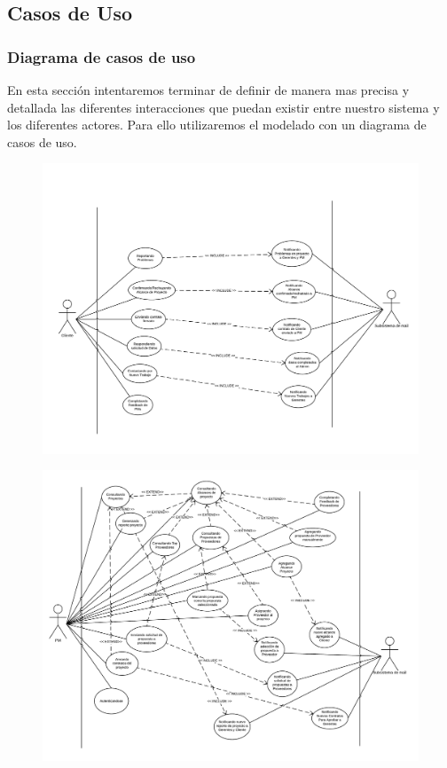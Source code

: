 \subsection{Casos de Uso}
	\subsubsection{Diagrama de casos de uso}
En esta sección intentaremos terminar de definir de manera mas precisa y detallada las diferentes interacciones que puedan existir entre nuestro sistema y los diferentes actores. Para ello utilizaremos el modelado con un diagrama de casos de uso.

\begin{figure}[H]
\centering
\includegraphics[width=\linewidth]{diag/viejos/cu1.pdf}
\end{figure}

\begin{figure}[H]
\centering
\includegraphics[width=\linewidth]{diag/viejos/cu2.pdf}
\end{figure}

